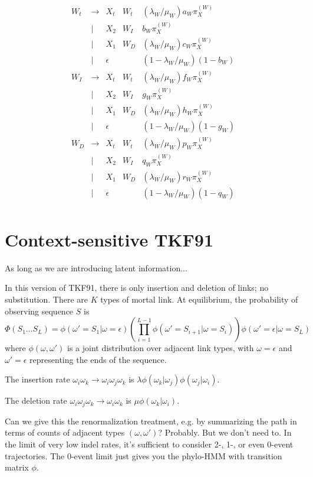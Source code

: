 \documentclass{article}
\begin{document}
\[
\begin{array}{rclll}
  W_t & \to & X_t & W_t & (\lambda_W/\mu_W) a_W \pi^{(W)}_X  \\
      & | & X_2 & W_I & b_W \pi^{(W)}_X \\
      & | & X_1 & W_D & (\lambda_W/\mu_W) c_W \pi^{(W)}_X \\
      & | & \epsilon & & (1 - \lambda_W/\mu_W) (1-b_W) \\
  W_I & \to & X_t & W_t & (\lambda_W/\mu_W) f_W \pi^{(W)}_X \\
      & | & X_2 & W_I & g_W \pi^{(W)}_X \\
      & | & X_1 & W_D & (\lambda_W/\mu_W) h_W \pi^{(W)}_X \\
      & | & \epsilon & & (1 - \lambda_W/\mu_W) (1-g_W) \\
  W_D & \to & X_t & W_t & (\lambda_W/\mu_W) p_W \pi^{(W)}_X \\
      & | & X_2 & W_I & q_W \pi^{(W)}_X \\
      & | & X_1 & W_D & (\lambda_W/\mu_W) r_W \pi^{(W)}_X \\
      & | & \epsilon & & (1 - \lambda_W/\mu_W) (1-q_W) \\
\end{array}
\]

\section{Context-sensitive TKF91}

As long as we are introducing latent information...

In this version of TKF91, there is only insertion and deletion of links; no substitution.
There are $K$ types of mortal link.
At equilibrium, the probability of observing sequence $S$
is
\[
\Phi(S_1 \ldots S_L) =
\phi(\omega'=S_1|\omega=\epsilon)
\left( \prod_{i=1}^{L-1} \phi(\omega'=S_{i+1}|\omega=S_i) \right)
\phi(\omega'=\epsilon|\omega=S_L)
\]
where $\phi(\omega,\omega')$ is a joint distribution over adjacent link types,
with $\omega=\epsilon$ and $\omega'=\epsilon$ representing the ends of the sequence.

The insertion rate $\omega_i \omega_k \to \omega_i \omega_j \omega_k$
is $\lambda \phi(\omega_k|\omega_j) \phi(\omega_j|\omega_i)$.

The deletion rate $\omega_i \omega_j \omega_k \to \omega_i \omega_k$
is $\mu \phi(\omega_k|\omega_i)$.

Can we give this the renormalization treatment, e.g. by summarizing the path in terms of counts of adjacent types $(\omega,\omega')$?
Probably. But we don't need to. In the limit of very low indel rates, it's sufficient to consider 2-, 1-, or even 0-event trajectories.
The 0-event limit just gives you the phylo-HMM with transition matrix $\phi$.




\end{document}
